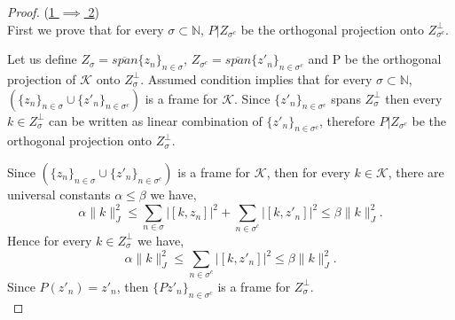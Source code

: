 \documentclass[article,12pt]{amsart}
\begin{document}
\begin{proof}
	
 \noindent  (\underline{1 $\implies$ 2})\\
 First we prove that for every $\sigma \subset \mathbb N$, $P|Z_{\sigma^c}$ be the orthogonal projection  onto $Z^\perp_{\sigma^c}$.
 
	Let us define $ Z_{\sigma} = \overline{span} \{z_n\}_{n \in \sigma}$, 
	$ Z_{\sigma^c} = \overline{span} \{z'_n\}_{n \in \sigma^c}$ and P be the orthogonal projection of $\mathcal{K}$ onto $Z_{\sigma}^\perp$.
	Assumed condition implies that for every $\sigma \subset \mathbb N$, $(\{z_n\}_{n \in \sigma} \cup \{z'_n\}_{n \in \sigma^c})$ is a  frame for $\mathcal{K}$.
	Since $\{z'_n\}_{n \in \sigma^c}$ spans $Z_{\sigma}^\perp$ then every $k \in Z_{\sigma}^\perp$ can be written as linear combination of $\{z'_n\}_{n \in \sigma^c}$, therefore  $P|Z_{\sigma^c}$ be the orthogonal projection  onto $Z^\perp_{\sigma}$.
	

	Since $(\{z_n\}_{n \in \sigma} \cup \{z'_n\}_{n \in \sigma^c})$ is a  frame for $\mathcal{K}$, then for every  $k \in \mathcal{K}$, there are universal constants $\alpha \leq \beta$ we have,
	$$\alpha \|k\|_{J}^2 \leq \sum\limits_{n \in \sigma} |[k, z_n]|^2 + \sum\limits_{n \in \sigma^c} |[k, z'_n]|^2 \leq \beta \|k\|_{J}^2.$$
Hence	for every $k \in Z_{\sigma}^\perp$ we have,
	$$\alpha \|k\|_{J}^2 \leq  \sum\limits_{n \in \sigma^c} |[k, z'_n]|^2 \leq \beta \|k\|_{J}^2.$$
	Since $P(z'_n) = z'_n$, then $\{Pz'_n\}_{n \in \sigma^c}$ is a frame for $Z_{\sigma}^\perp.$\\
	

\end{proof}
\end{document}
